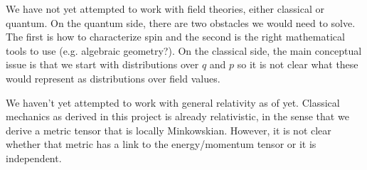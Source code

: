 \documentclass[twocolumn]{article}
\begin{document}
We have not yet attempted to work with field theories, either classical or quantum. On the quantum side, there are two obstacles we would need to solve. The first is how to characterize spin and the second is the right mathematical tools to use (e.g. algebraic geometry?). On the classical side, the main conceptual issue is that we start with distributions over $q$ and $p$ so it is not clear what these would represent as distributions over field values.

We haven't yet attempted to work with general relativity as of yet. Classical mechanics as derived in this project is already relativistic, in the sense that we derive a metric tensor that is locally Minkowskian. However, it is not clear whether that metric has a link to the energy/momentum tensor or it is independent.
\end{document}
